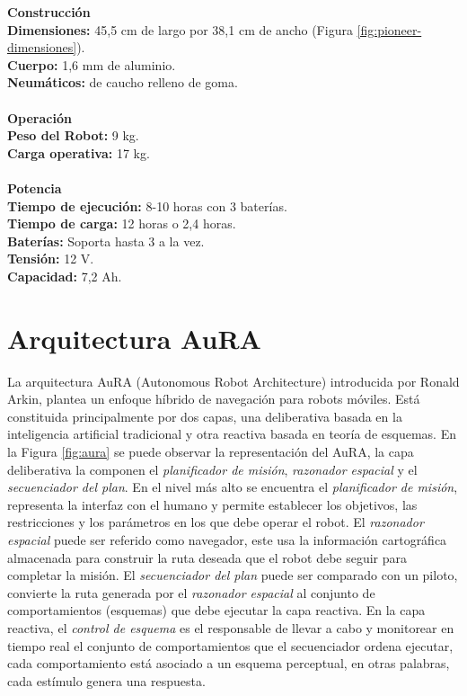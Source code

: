 \documentclass[11pt,twoside,A5]{article}
\newcommand{\reffigure}[1]{Figura \ref{#1}}
\newcommand{\refpfigure}[1]{(\reffigure{#1})}
\begin{document}
\noindent\textbf{Construcción}
\\
\indent\textbf{Dimensiones:} 45,5 cm de largo por 38,1 cm de ancho \refpfigure{fig:pioneer-dimensiones}.
\\
\indent\textbf{Cuerpo:} 1,6 mm de aluminio.
\\
\indent\textbf{Neumáticos:} de caucho relleno de goma.
\\\\
\noindent\textbf{Operación}
\\
\indent\textbf{Peso del Robot:} 9 kg.
\\
\indent\textbf{Carga operativa:} 17 kg.
\\\\
\noindent\textbf{Potencia}
\\
\indent\textbf{Tiempo de ejecución:} 8-10 horas con 3 baterías.
\\
\indent\textbf{Tiempo de carga:} 12 horas o 2,4 horas.
\\
\indent\textbf{Baterías:} Soporta hasta 3 a la vez.
\\
\indent\textbf{Tensión:} 12 V.
\\
\indent\textbf{Capacidad:} 7,2 Ah.



\section*{Arquitectura AuRA}

La arquitectura AuRA \cite{arkin1997} (Autonomous Robot Architecture) introducida por Ronald Arkin, plantea un enfoque híbrido
de navegación para robots móviles. Está constituida principalmente por dos capas, una deliberativa basada en la inteligencia artificial
tradicional y otra reactiva basada en teoría de esquemas. En la \reffigure{fig:aura} se puede observar la representación del AuRA, 
la capa deliberativa la componen el \textit{planificador de misión}, \textit{razonador espacial} y el \textit{secuenciador del plan}. En el nivel más alto se encuentra el \textit{planificador de misión}, representa la interfaz con el humano y permite establecer los objetivos, 
las restricciones y los parámetros en los que debe operar el robot. El \textit{razonador espacial} puede ser referido como navegador, este usa la información cartográfica
almacenada para construir la ruta deseada que el robot debe seguir para completar la misión. El \textit{secuenciador del plan}
puede ser comparado con un piloto, convierte la ruta generada por el \textit{razonador espacial} al conjunto de comportamientos (esquemas) que debe ejecutar la capa reactiva. En la capa reactiva, el \textit{control de esquema} es el responsable de llevar a cabo y monitorear en tiempo real el conjunto de comportamientos que el secuenciador ordena ejecutar, cada comportamiento está asociado a un esquema perceptual, en otras palabras, cada estímulo genera una respuesta. 
\end{document}

